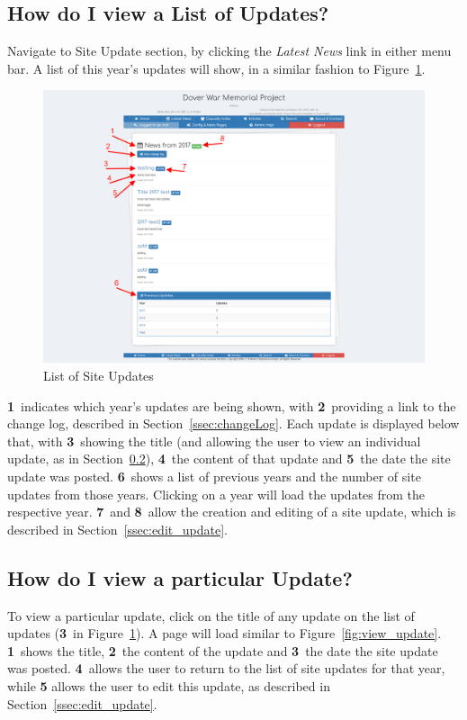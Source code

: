 \documentclass[12pt]{article}
\newcommand{\marker}[1]{\color{red}\textbf{#1}\color{black}}
\begin{document}
\subsection{How do I view a List of Updates?}\label{ssec:view_updates}

Navigate to Site Update section, by clicking the \textit{Latest News} link in either menu bar. A list of this year's updates will show, in a similar fashion to Figure~\ref{fig:view_updates}.

\begin{figure}[h]
  \centering
 \includegraphics[width=.9\textwidth]{pics/view_updates.png}
	\caption{List of Site Updates}\label{fig:view_updates}
\end{figure}

\marker{1}\ indicates which year's updates are being shown, with \marker{2}\ providing a link to the change log, described in Section~\ref{ssec:changeLog}. Each update is displayed below that, with \marker{3}\ showing the title (and allowing the user to view an individual update, as in Section~\ref{ssec:view_update}), \marker{4}\ the content of that update and \marker{5}\ the date the site update was posted. \marker{6}\ shows a list of previous years and the number of site updates from those years. Clicking on a year will load the updates from the respective year. \marker{7}\ and \marker{8}\ allow the creation and editing of a site update, which is described in Section~\ref{ssec:edit_update}.

\newpage
\FloatBarrier
\subsection{How do I view a particular Update?}\label{ssec:view_update}
To view a particular update, click on the title of any update on the list of updates (\marker{3}\ in Figure~\ref{fig:view_updates}). A page will load similar to Figure~\ref{fig:view_update}. \marker{1}\ shows the title, \marker{2}\ the content of the update and \marker{3}\ the date the site update was posted. \marker{4}\ allows the user to return to the list of site updates for that year, while \marker{5} allows the user to edit this update, as described in Section~\ref{ssec:edit_update}.
\end{document}

